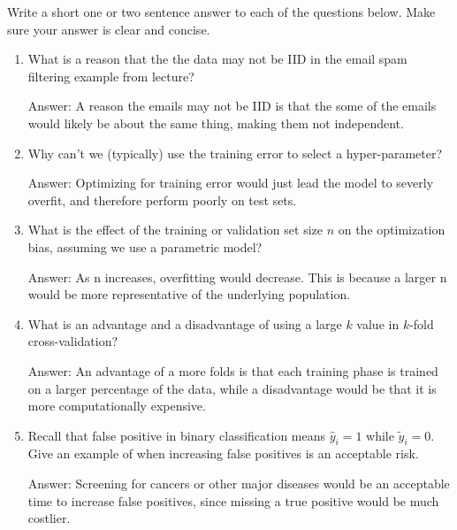 \documentclass{article}
\newcommand{\blu}[1]{{\textcolor{blu}{#1}}}
\newenvironment{answer}{\par\begingroup\color{gre}Answer: }{\endgroup}
\let\ask\blu
\begin{document}
    \ask{Write a short one or two sentence answer to each of the questions below}. Make sure your answer is clear and concise.

    \begin{enumerate}
        \item What is a reason that the the data may not be IID in the email spam filtering example from lecture?
        \begin{answer}
            A reason the emails may not be IID is that the some of the emails would likely be about the same thing, making them not independent.
        \end{answer}

        \item Why can't we (typically) use the training error to select a hyper-parameter?
        \begin{answer}
            Optimizing for training error would just lead the model to severly overfit, and therefore perform poorly on test sets.
        \end{answer}

        \item What is the effect of the training or validation set size $n$ on the optimization bias, assuming we use a parametric model?
        \begin{answer}
            As n increases, overfitting would decrease. This is because a larger n would be more representative of the underlying population.
        \end{answer}

        \item What is an advantage and a disadvantage of using a large $k$ value in $k$-fold cross-validation?
        \begin{answer}
            An advantage of a more folds is that each training phase is trained on a larger percentage of the data, while a disadvantage would be that it is more computationally expensive. 
        \end{answer}

        \item Recall that false positive in binary classification means $\hat y_i=1$ while $\tilde y_i = 0$. Give an example of when increasing false positives is an acceptable risk.
        \begin{answer}
            Screening for cancers or other major diseases would be an acceptable time to increase false positives, since missing a true positive would be much costlier.
        \end{answer}


\end{enumerate}
\end{document}
